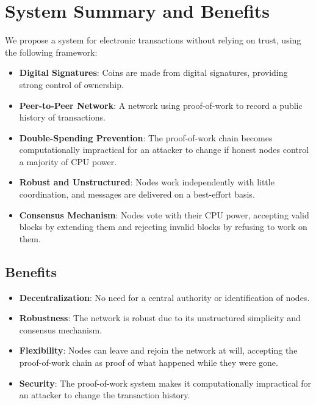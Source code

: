 \documentclass{article}
\begin{document}
\section*{System Summary and Benefits}

We propose a system for electronic transactions without relying on trust, using the following framework:

\begin{itemize}
    \item \textbf{Digital Signatures}: Coins are made from digital signatures, providing strong control of ownership.
    \item \textbf{Peer-to-Peer Network}: A network using proof-of-work to record a public history of transactions.
    \item \textbf{Double-Spending Prevention}: The proof-of-work chain becomes computationally impractical for an attacker to change if honest nodes control a majority of CPU power.
    \item \textbf{Robust and Unstructured}: Nodes work independently with little coordination, and messages are delivered on a best-effort basis.
    \item \textbf{Consensus Mechanism}: Nodes vote with their CPU power, accepting valid blocks by extending them and rejecting invalid blocks by refusing to work on them.
\end{itemize}

\subsection*{Benefits}

\begin{itemize}
    \item \textbf{Decentralization}: No need for a central authority or identification of nodes.
    \item \textbf{Robustness}: The network is robust due to its unstructured simplicity and consensus mechanism.
    \item \textbf{Flexibility}: Nodes can leave and rejoin the network at will, accepting the proof-of-work chain as proof of what happened while they were gone.
    \item \textbf{Security}: The proof-of-work system makes it computationally impractical for an attacker to change the transaction history.
\end{itemize}
\end{document}
